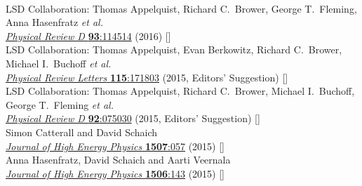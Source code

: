 \begin{spacelist}
\begin{revnumerate}
       \\
      LSD Collaboration: Thomas Appelquist, Richard C.~Brower, George T.~Fleming, Anna Hasenfratz \textit{et al.} \\ %
      \href{https://doi.org/10.1103/PhysRevD.93.114514}{\textit{Physical Review D} \textbf{93}:114514} (2016) []
    \pagebreakitem
       \\
      LSD Collaboration: Thomas Appelquist, Evan Berkowitz, Richard C.~Brower, Michael I.~Buchoff \textit{et al.} \\ %
      \href{https://doi.org/10.1103/PhysRevLett.115.171803}{\textit{Physical Review Letters} \textbf{115}:171803} (2015, Editors' Suggestion) []
    \pagebreakitem
       \\
      LSD Collaboration: Thomas Appelquist, Richard C.~Brower, Michael I.~Buchoff, George T.~Fleming \textit{et al.} \\ %
      \href{https://doi.org/10.1103/PhysRevD.92.075030}{\textit{Physical Review D} \textbf{92}:075030} (2015, Editors' Suggestion) []
    \pagebreakitem
       \\
      Simon Catterall and David Schaich \\
      \href{https://doi.org/10.1007/JHEP07(2015)057}{\textit{Journal of High Energy Physics} \textbf{1507}:057} (2015) []
    \pagebreakitem
       \\
      Anna Hasenfratz, David Schaich and Aarti Veernala \\
      \href{https://doi.org/10.1007/JHEP06(2015)143}{\textit{Journal of High Energy Physics} \textbf{1506}:143} (2015) []

\end{revnumerate}
\end{spacelist}
